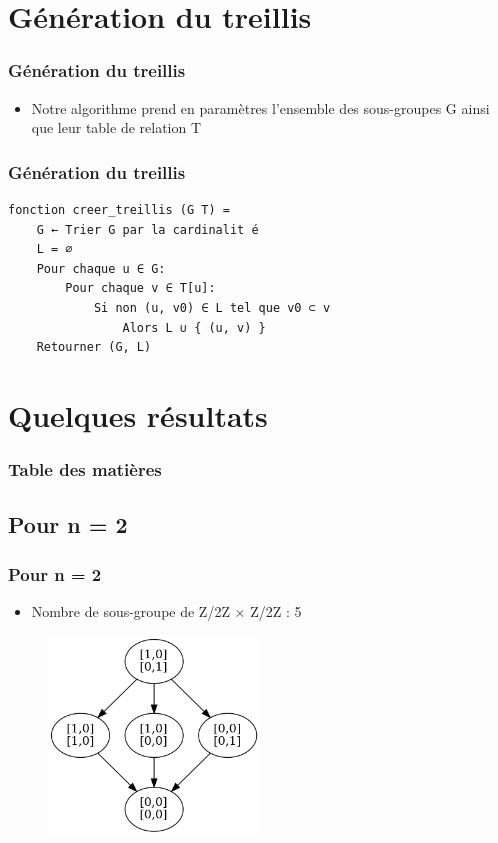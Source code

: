 \documentclass{beamer}
\begin{document}
\section{Génération du treillis}
\begin{frame}
\frametitle{Génération du treillis}
\tableofcontents[currentsection]
\end{frame}

\begin{frame}[fragile]
\begin{itemize}
    \item Notre algorithme prend en paramètres l’ensemble des sous-groupes G ainsi que leur table
de relation T
\end{itemize}
\frametitle{Génération du treillis}
\begin{verbatim}
fonction creer_treillis (G T) =
    G ← Trier G par la cardinalit é
    L = ∅
    Pour chaque u ∈ G:
        Pour chaque v ∈ T[u]:
            Si non (u, v0) ∈ L tel que v0 ⊂ v
                Alors L ∪ { (u, v) }
    Retourner (G, L)
\end{verbatim}
\end{frame}

\section{Quelques résultats}
\begin{frame}
\frametitle{Table des matières}
\tableofcontents[currentsection]
\end{frame}

\subsection{Pour n = 2}
\begin{frame}
\frametitle{Pour n = 2}
\begin{itemize}
    \item Nombre de sous-groupe de Z/2Z × Z/2Z : 5
\end{itemize}
\begin{figure}
  \centering
  \includegraphics[width=0.5\textwidth]{Z2ZxZ2Z.png}
\end{figure}
\end{frame}
\end{document}
